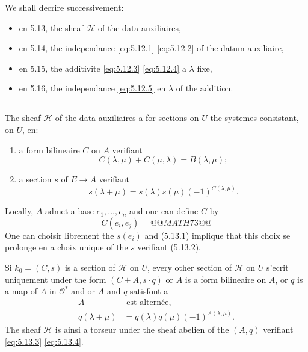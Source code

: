 \documentclass[12pt,a4paper]{article}
\theoremstyle{plain}
\theoremstyle{definition}
\theoremstyle{remark}
\newcommand{\cO}{\mathcal{O}}
\providecommand{\cO}{\mathcal{O}}
\begin{document}
We shall decrire successivement:
\begin{itemize}
\item en 5.13, the sheaf $\mathscr{H}$ of the data auxiliaires,
\item en 5.14, the independance \eqref{eq:5.12.1} \eqref{eq:5.12.2} of the datum auxiliaire,
\item en 5.15, the additivite \eqref{eq:5.12.3} \eqref{eq:5.12.4} a $\lambda$ fixe,
\item en 5.16, the independance \eqref{eq:5.12.5} en $\lambda$ of the addition.
\end{itemize}

\subsection{}

The sheaf $\mathscr{H}$ of the data auxiliaires a for sections on $U$ the systemes
consistant, on $U$, en:
\begin{enumerate}[label=(\arabic*)]
\item[(5.13.1)] a form bilineaire $C$ on $A$ verifiant
\[
C(\lambda, \mu) + C(\mu, \lambda) = B(\lambda, \mu);
\]
\item[(5.13.2)] a section $s$ of $E \to A$ verifiant
\[
s(\lambda + \mu) = s(\lambda) s(\mu) (-1)^{C(\lambda, \mu)}.
\]
\end{enumerate}
Locally, $A$ admet a base $e_1, \ldots, e_n$ and one can define $C$ by
\[
C(e_i, e_j) = @@MATH73@@
\]
One can choisir librement the $s(e_i)$ and (5.13.1) implique that this choix se prolonge
en a choix unique of the $s$ verifiant (5.13.2).

Si $k_0 = (C, s)$ is a section of $\mathscr{H}$ on $U$, every other section of $\mathscr{H}$ on $U$ s'ecrit
uniquement under the form $(C + A, s \cdot q)$ or $A$ is a form bilineaire on $A$, or $q$ is
a map of $A$ in $\cO^*$ and or $A$ and $q$ satisfont a
\begin{align}
A &\text{ est alternée}, \label{eq:5.13.3} \\
q(\lambda + \mu) &= q(\lambda) q(\mu) (-1)^{A(\lambda, \mu)}. \label{eq:5.13.4}
\end{align}
The sheaf $\mathscr{H}$ is ainsi a torseur under the sheaf abelien of the $(A, q)$ verifiant
\eqref{eq:5.13.3} \eqref{eq:5.13.4}.

\subsection{}
\end{document}
